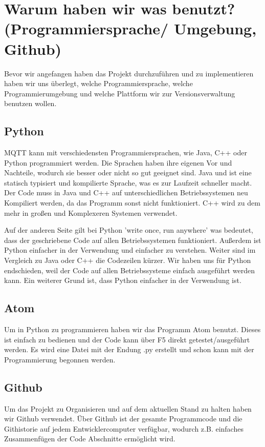 \section{Warum haben wir was benutzt? (Programmiersprache/ Umgebung, Github)}
Bevor wir angefangen haben das Projekt durchzuführen und zu implementieren haben wir uns überlegt, welche Programmiersprache, welche Programmierumgebung und welche Plattform wir zur Versionsverwaltung benutzen wollen.

\subsection{Python}
MQTT kann mit verschiedensten Programmiersprachen, wie Java, C++ oder Python programmiert werden.
Die Sprachen haben ihre eigenen Vor und Nachteile, wodurch sie besser oder nicht so gut geeignet sind.
Java und ist eine statisch typisiert und kompilierte Sprache, was es zur Laufzeit schneller macht. Der Code muss in Java und C++ auf unterschiedlichen Betriebssystemen neu Kompiliert werden, da das Programm sonst nicht funktioniert.\cite{b2}
C++ wird zu dem mehr in großen und Komplexeren Systemen verwendet.\cite{b3}

Auf der anderen Seite gilt bei Python 'write once, run anywhere' was bedeutet, dass der geschriebene Code auf allen Betriebssystemen funktioniert. 
Außerdem ist Python einfacher in der Verwendung und einfacher zu verstehen. Weiter sind im Vergleich zu Java oder C++ die Codezeilen kürzer.
Wir haben uns für Python endschieden, weil der Code auf allen Betriebssysteme einfach ausgeführt werden kann. Ein weiterer Grund ist, dass Python einfacher in der Verwendung ist.


\subsection{Atom}
Um in Python zu programmieren haben wir das Programm Atom benutzt. Dieses ist einfach zu bedienen und der Code kann über F5 direkt getestet/ausgeführt werden.
Es wird eine Datei mit der Endung .py erstellt und schon kann mit der Programmierung begonnen werden.

\subsection{Github}
Um das Projekt zu Organisieren und auf dem aktuellen Stand zu halten haben wir Github verwendet.
Über Github ist der gesamte Programmcode und die Githistorie auf jedem Entwicklercomputer verfügbar, wodurch z.B. einfaches Zusammenfügen der Code Abschnitte ermöglicht wird.\cite{b4}
